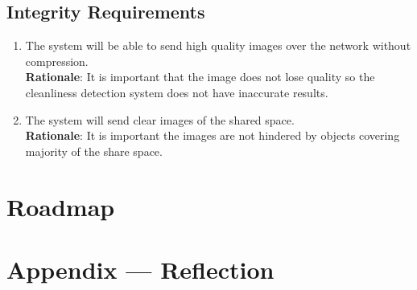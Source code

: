 \documentclass{article}
\begin{document}
\subsection{Integrity Requirements}
\begin{enumerate}[{IR}1. ]
    \item The system will be able to send high quality images over the network without compression.\\
    \textbf{Rationale}: It is important that the image does not lose quality so the cleanliness detection system does not have inaccurate results. 
    \item The system will send clear images of the shared space.\\
    \textbf{Rationale}: It is important the images are not hindered by objects covering majority of the share space. 
\end{enumerate} 

\section{Roadmap}


\newpage{}

\section*{Appendix --- Reflection}
\end{document}

